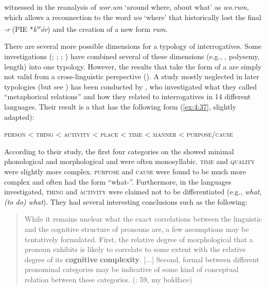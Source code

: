 witnessed in the reanalysis of  \textit{wor.um} ‘around where, about what’ as \textit{wo.}\textit{rum}, which allows a reconnection to the word \textit{wo} ‘where’ that historically lost the final \textit{-r} (PIE *\textit{k\textsuperscript{w}}\textit{ór}) and the creation of a new form \textit{rum}.

There are several more possible dimensions for a typology of interrogatives. Some investigations (\citealt{Heine1991}; \citealt{Peyraube2005}; \citealt{Mackenzie2009}; \citealt{Hengeveld2012}) have combined several of these dimensions (e.g., , polysemy, length) into one typology. However, the results that take the form of a  are simply not valid from a cross-linguistic perspective (\citealt{Hölzl2015c}). A study mostly neglected in later typologies (but see \citealt{Peyraube2005}) has been conducted by \citet{Heine1991}, who investigated what they called “metaphorical relations” and how they related to interrogatives in 14 different languages. Their result is a  that has the following form (\ref{ex:4:37}, slightly adapted):

\ea\upshape%
    \label{ex:4:37}
    \textsc{person < thing < activity < place < time < manner < purpose/cause}
    \z

\noindent According to their study, the first four categories on the  showed minimal phonological and morphological  and were often monosyllabic. \textsc{time} and \textsc{quality} were slightly more complex. \textsc{purpose} and \textsc{cause} were found to be much more complex and often had the form “what-”. Furthermore, in the languages investigated, \textsc{thing} and \textsc{activity} were claimed not to be differentiated (e.g.,  \textit{what}, \textit{(to do) what}). They had several interesting conclusions such as the following:

\begin{quote}
While it remains unclear what the exact correlations between the linguistic and the cognitive structure of pronouns are, a few assumptions may be tentatively formulated. First, the relative degree of morphological  that a pronoun exhibits is likely to correlate to some extent with the relative degree of its \textbf{cognitive} \textbf{complexity}. [...] Second, formal  between different pronominal categories may be indicative of some kind of conceptual relation between these categories. (\citealt{Heine1991}: 59, my boldface)
\end{quote}

